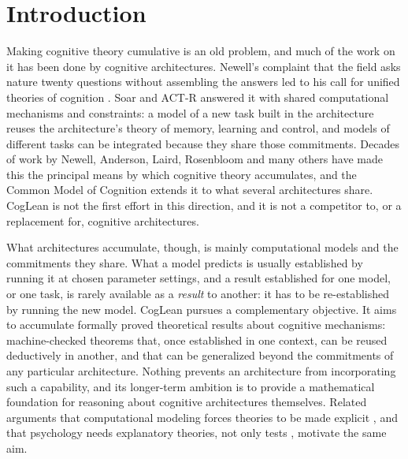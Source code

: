 \documentclass[11pt]{article}
\begin{document}
\section{Introduction}
\label{sec:intro}

Making cognitive theory cumulative is an old problem, and much of the work on it has been done by cognitive architectures. Newell's complaint that the field asks nature twenty questions without assembling the answers \citep{newell1973} led to his call for unified theories of cognition \citep{newell1990}. Soar \citep{laird1987,laird2012} and ACT-R \citep{anderson2007} answered it with shared computational mechanisms and constraints: a model of a new task built in the architecture reuses the architecture's theory of memory, learning and control, and models of different tasks can be integrated because they share those commitments. Decades of work by Newell, Anderson, Laird, Rosenbloom and many others have made this the principal means by which cognitive theory accumulates, and the Common Model of Cognition \citep{laird2017} extends it to what several architectures share. CogLean is not the first effort in this direction, and it is not a competitor to, or a replacement for, cognitive architectures.

What architectures accumulate, though, is mainly computational models and the commitments they share. What a model predicts is usually established by running it at chosen parameter settings, and a result established for one model, or one task, is rarely available as a \emph{result} to another: it has to be re-established by running the new model. CogLean pursues a complementary objective. It aims to accumulate formally proved theoretical results about cognitive mechanisms: machine-checked theorems that, once established in one context, can be reused deductively in another, and that can be generalized beyond the commitments of any particular architecture. Nothing prevents an architecture from incorporating such a capability, and its longer-term ambition is to provide a mathematical foundation for reasoning about cognitive architectures themselves. Related arguments that computational modeling forces theories to be made explicit \citep{guest2021}, and that psychology needs explanatory theories, not only tests \citep{vanrooij2021}, motivate the same aim.
\end{document}
